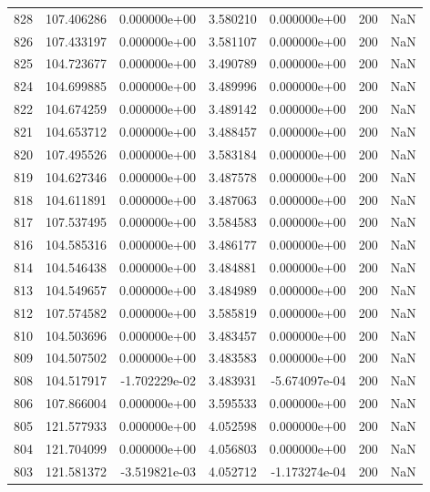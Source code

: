 \begin{tabular}{rrrrrrr}
 828 & 107.406286 &  0.000000e+00 &  3.580210 &  0.000000e+00 &         200 & NaN \\
 826 & 107.433197 &  0.000000e+00 &  3.581107 &  0.000000e+00 &         200 & NaN \\
 825 & 104.723677 &  0.000000e+00 &  3.490789 &  0.000000e+00 &         200 & NaN \\
 824 & 104.699885 &  0.000000e+00 &  3.489996 &  0.000000e+00 &         200 & NaN \\
 822 & 104.674259 &  0.000000e+00 &  3.489142 &  0.000000e+00 &         200 & NaN \\
 821 & 104.653712 &  0.000000e+00 &  3.488457 &  0.000000e+00 &         200 & NaN \\
 820 & 107.495526 &  0.000000e+00 &  3.583184 &  0.000000e+00 &         200 & NaN \\
 819 & 104.627346 &  0.000000e+00 &  3.487578 &  0.000000e+00 &         200 & NaN \\
 818 & 104.611891 &  0.000000e+00 &  3.487063 &  0.000000e+00 &         200 & NaN \\
 817 & 107.537495 &  0.000000e+00 &  3.584583 &  0.000000e+00 &         200 & NaN \\
 816 & 104.585316 &  0.000000e+00 &  3.486177 &  0.000000e+00 &         200 & NaN \\
 814 & 104.546438 &  0.000000e+00 &  3.484881 &  0.000000e+00 &         200 & NaN \\
 813 & 104.549657 &  0.000000e+00 &  3.484989 &  0.000000e+00 &         200 & NaN \\
 812 & 107.574582 &  0.000000e+00 &  3.585819 &  0.000000e+00 &         200 & NaN \\
 810 & 104.503696 &  0.000000e+00 &  3.483457 &  0.000000e+00 &         200 & NaN \\
 809 & 104.507502 &  0.000000e+00 &  3.483583 &  0.000000e+00 &         200 & NaN \\
 808 & 104.517917 & -1.702229e-02 &  3.483931 & -5.674097e-04 &         200 & NaN \\
 806 & 107.866004 &  0.000000e+00 &  3.595533 &  0.000000e+00 &         200 & NaN \\
 805 & 121.577933 &  0.000000e+00 &  4.052598 &  0.000000e+00 &         200 & NaN \\
 804 & 121.704099 &  0.000000e+00 &  4.056803 &  0.000000e+00 &         200 & NaN \\
 803 & 121.581372 & -3.519821e-03 &  4.052712 & -1.173274e-04 &         200 & NaN \\

\end{tabular}
